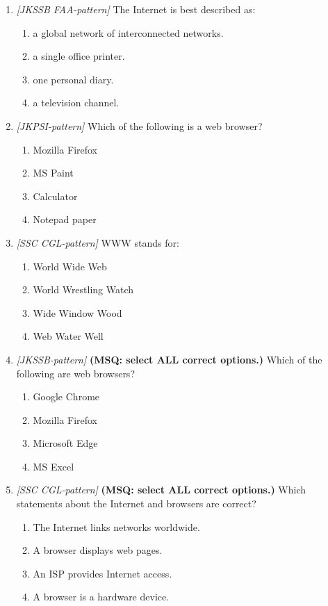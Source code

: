 \begin{enumerate}[label=\textbf{Q\arabic*.}, leftmargin=*]
\item \textit{[JKSSB FAA-pattern]} The Internet is best described as:
  \begin{enumerate}[label=\Alph*.]
    \item a global network of interconnected networks.
    \item a single office printer.
    \item one personal diary.
    \item a television channel.
  \end{enumerate}
\item \textit{[JKPSI-pattern]} Which of the following is a web browser?
  \begin{enumerate}[label=\Alph*.]
    \item Mozilla Firefox
    \item MS Paint
    \item Calculator
    \item Notepad paper
  \end{enumerate}
\item \textit{[SSC CGL-pattern]} WWW stands for:
  \begin{enumerate}[label=\Alph*.]
    \item World Wide Web
    \item World Wrestling Watch
    \item Wide Window Wood
    \item Web Water Well
  \end{enumerate}
\item \textit{[JKSSB-pattern]} \textbf{(MSQ: select ALL correct options.)} Which of the following are web browsers?
  \begin{enumerate}[label=\Alph*.]
    \item Google Chrome
    \item Mozilla Firefox
    \item Microsoft Edge
    \item MS Excel
  \end{enumerate}
\item \textit{[SSC CGL-pattern]} \textbf{(MSQ: select ALL correct options.)} Which statements about the Internet and browsers are correct?
  \begin{enumerate}[label=\Alph*.]
    \item The Internet links networks worldwide.
    \item A browser displays web pages.
    \item An ISP provides Internet access.
    \item A browser is a hardware device.

\end{enumerate}
\end{enumerate}
